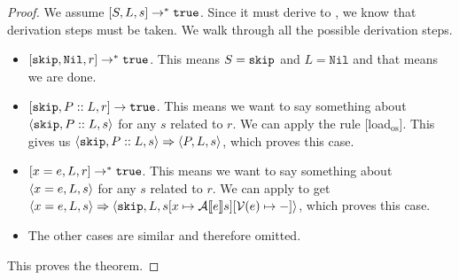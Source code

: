 \begin{proof}
We assume $[ S, L, s ] \to ^* \texttt{true}$. Since it must derive to \tr, we know that derivation steps must be taken. We walk through all the possible derivation steps. 
\begin{itemize}[noitemsep]
    \item $[ \texttt{skip}, \texttt{Nil}, r ] \to ^* \texttt{true}$. This means $S = \texttt{skip}$ and $L = \texttt{Nil}$ and that means we are done.
    \item $[ \texttt{skip}, P::L,  r ] \to \texttt{true}$. This means we want to say something about $\langle \texttt{skip}, P::L, s \rangle$ for any $s$ related to $r$. We can apply the rule [load$_{\textrm{os}}$]. This gives us $\langle \texttt{skip}, P::L, s \rangle \Rightarrow \langle P, L, s \rangle$, which proves this case. 
    \item $[ x=e, L, r ] \to ^{*} \texttt{true}$. This means we want to say something about $\langle x=e, L, s \rangle$ for any $s$ related to $r$. We can apply \asssos to get $\langle x=e, L, s \rangle \Rightarrow \langle \texttt{skip}, L, s[x \mapsto \mathcal{A} \llbracket e \rrbracket s][\mathcal{V}(e)\mapsto-] \rangle$, which proves this case. 
     \item The other cases are similar and therefore omitted. 
\end{itemize}
This proves the theorem.
\end{proof}

 



